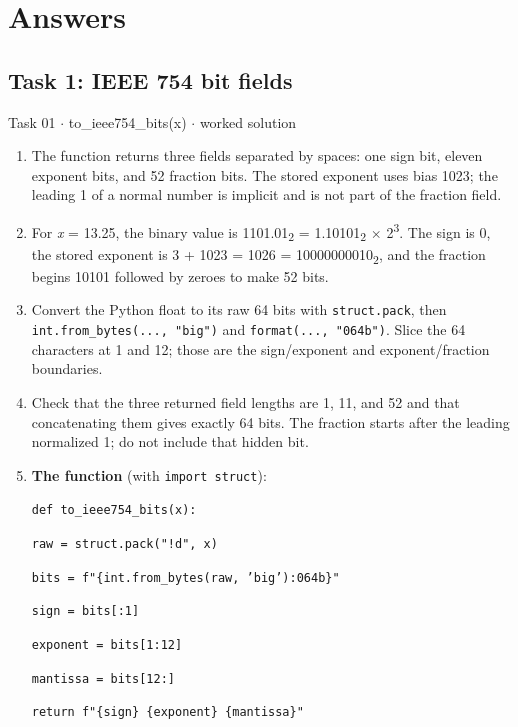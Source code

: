 \documentclass[11pt]{article}
\begin{document}
\section{Answers}
\begin{keepsection}\subsection{Task 1: IEEE 754 bit fields}

\begin{workedbox}{Task 01 \ensuremath{\cdot} to\_ieee754\_bits(x) \ensuremath{\cdot} worked solution}
\begin{enumerate}
\item The function returns three fields separated by spaces: one sign bit, eleven exponent bits, and 52 fraction bits. The stored exponent uses bias 1023; the leading 1 of a normal number is implicit and is not part of the fraction field.
\item For \textit{x} = 13.25, the binary value is 1101.01\textsubscript{2} = 1.10101\textsubscript{2} \ensuremath{\times} 2\textsuperscript{3}. The sign is 0, the stored exponent is 3 + 1023 = 1026 = 10000000010\textsubscript{2}, and the fraction begins 10101 followed by zeroes to make 52 bits.
\item Convert the Python float to its raw 64 bits with \texttt{struct.pack}, then \texttt{int.from\_bytes(..., "big")} and \texttt{format(..., "064b")}. Slice the 64 characters at 1 and 12; those are the sign/exponent and exponent/fraction boundaries.
\item Check that the three returned field lengths are 1, 11, and 52 and that concatenating them gives exactly 64 bits. The fraction starts after the leading normalized 1; do not include that hidden bit.
\item {}
\textbf{The function} (with \texttt{import struct}):
\begin{tcolorbox}[colback=Paperblue,colframe=Paperblue,boxrule=0pt,arc=0pt,left=7pt,right=7pt,top=5pt,bottom=5pt]\small\sloppy
\noindent\hspace*{0em}\texttt{def to\_ieee754\_bits(x):}\par
\noindent\hspace*{1em}\texttt{raw = struct.pack("!d", x)}\par
\noindent\hspace*{1em}\texttt{bits = f"\{int.from\_bytes(raw, 'big'):064b\}"}\par
\noindent\hspace*{1em}\texttt{sign = bits[:1]}\par
\noindent\hspace*{1em}\texttt{exponent = bits[1:12]}\par
\noindent\hspace*{1em}\texttt{mantissa = bits[12:]}\par
\noindent\hspace*{1em}\texttt{return f"\{sign\} \{exponent\} \{mantissa\}"}\par
\end{tcolorbox}
\end{enumerate}
\end{workedbox}


\end{keepsection}
\end{document}
